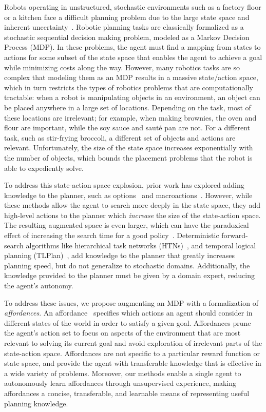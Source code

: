 \documentclass[conference]{IEEEtran}
\begin{document}
Robots operating in unstructured, stochastic environments such as a
factory floor or a kitchen face a difficult planning problem due to
the large state space and inherent
uncertainty~\citep{bollini12,knepper13}.  Robotic planning tasks are
classically formalized as a stochastic sequential decision making
problem, modeled as a Markov Decision Process (MDP). In these
problems, the agent must find a mapping from states to actions for
some subset of the state space that enables the agent to achieve a
goal while minimizing costs along the way. However, many robotics
tasks are so complex that modeling them as an MDP results in a massive
state/action space, which in turn restricts the types of robotics
problems that are computationally tractable: when a robot is
manipulating objects in an environment, an object can be placed
anywhere in a large set of locations.  Depending on the task, most of
these locations are irrelevant; for example, when making brownies, the
oven and flour are important, while the soy sauce and saut\'{e} pan
are not.  For a different task, such as stir-frying broccoli, a
different set of objects and actions are relevant.  Unfortunately, the
size of the state space increases exponentially with the number of
objects, which bounds the placement problems that the robot is able to
expediently solve.

To address this state-action space explosion, prior work has explored
adding knowledge to the planner, such as options~\cite{sutton99} and
macroactions~\cite{Botea:2005kx,Newton:2005vn}.  However, while these
methods allow the agent to search more deeply in the state space, they
add high-level actions to the planner which {\em increase} the size of
the state-action space.  The resulting augmented space is even larger,
which can have the paradoxical effect of increasing the search time
for a good policy~\cite{Jong:2008zr}.  
Deterministic forward-search algorithms like hierarchical task
networks (HTNs)~\citep{Nau:1999:SSH:1624312.1624357}, and temporal
logical planning (TLPlan)~\citep{Bacchus95usingtemporal,Bacchus99usingtemporal},
add knowledge to the planner that greatly increases planning speed, but do
not generalize to stochastic domains. Additionally, the knowledge
provided to the planner must be given by a domain expert, reducing the
agent's autonomy. 

To address these issues, we propose augmenting an MDP with a
formalization of {\em affordances}. An affordance~\cite{gibson77}
specifies which actions an agent should consider in different states
of the world in order to satisfy a given goal.  Affordances prune the
agent's action set to focus on aspects of the environment that are
most relevant to solving its current goal and avoid exploration of
irrelevant parts of the state-action space. Affordances are not
specific to a particular reward function or state space, and provide
the agent with transferable knowledge that is effective in a wide
variety of problems. Moreover, our methods enable a single agent to
autonomously learn affordances through unsupervised experience, making
affordances a concise, transferable, and learnable means of
representing useful planning knowledge.
\end{document}

